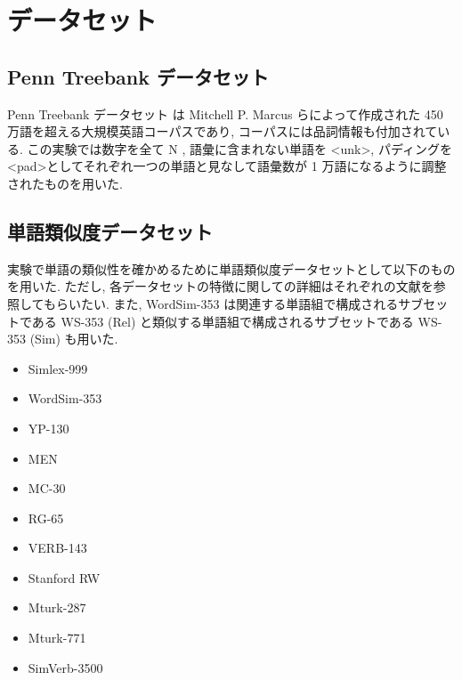 \documentclass[twocolumn]{jarticle}     %
\begin{document}
\section{データセット}
\subsection{Penn Treebank データセット}
Penn Treebank データセット \cite{ptb} は 	Mitchell P. Marcus らによって作成された 450 万語を超える大規模英語コーパスであり, コーパスには品詞情報も付加されている. 
この実験では数字を全て N , 語彙に含まれない単語を \textless unk\textgreater , パディングを \textless pad\textgreater としてそれぞれ一つの単語と見なして語彙数が 1 万語になるように調整されたものを用いた.

\subsection{単語類似度データセット}
実験で単語の類似性を確かめるために単語類似度データセットとして以下のものを用いた. 
ただし, 各データセットの特徴に関しての詳細はそれぞれの文献を参照してもらいたい. 
また, WordSim-353 は関連する単語組で構成されるサブセットである WS-353 (Rel) と類似する単語組で構成されるサブセットである WS-353 (Sim) も用いた. 

\begin{itemize}
  \item Simlex-999 \cite{simlex999}
  \item WordSim-353 \cite{wordsim353}
  \item YP-130 \cite{yp-130}
  \item MEN \cite{men}
  \item MC-30 \cite{mc-30}
  \item RG-65 \cite{rg-65}
  \item VERB-143 \cite{verb-143}
  \item Stanford RW \cite{stanford-rw}
  \item Mturk-287 \cite{mrutk-287}
  \item Mturk-771 \cite{mturk-771}
  \item SimVerb-3500 \cite{gerz-etal-2016-simverb}
\end{itemize}

\end{document}
